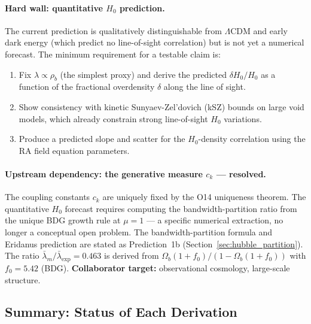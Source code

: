 \documentclass[11pt,a4paper]{article}
\theoremstyle{plain}
\theoremstyle{definition}
\theoremstyle{remark}
\begin{document}
\paragraph{Hard wall: quantitative $H_0$ prediction.}
The current prediction is qualitatively distinguishable from $\Lambda$CDM and
early dark energy (which predict no line-of-sight correlation) but is not yet
a numerical forecast. The minimum requirement for a testable claim is:
\begin{enumerate}[noitemsep]
  \item Fix $\lambda \propto \rho_b$ (the simplest proxy) and derive the
  predicted $\delta H_0 / H_0$ as a function of the fractional overdensity
  $\delta$ along the line of sight.
  \item Show consistency with kinetic Sunyaev-Zel'dovich (kSZ) bounds on large
  void models, which already constrain strong line-of-sight $H_0$ variations.
  \item Produce a predicted slope and scatter for the $H_0$-density correlation
  using the RA field equation parameters.
\end{enumerate}

\paragraph{Upstream dependency: the generative measure $c_k$ --- resolved.}
The coupling constants $c_k$ are uniquely fixed by the O14 uniqueness
theorem. The quantitative $H_0$ forecast requires computing the
bandwidth-partition ratio from the unique BDG growth rule at $\mu = 1$
--- a specific numerical extraction, no longer a conceptual open problem.
The bandwidth-partition formula
and Eridanus prediction are stated as Prediction~1b
(Section~\ref{sec:hubble_partition}). The ratio
$\bar\lambda_m/\bar\lambda_{\mathrm{exp}} = 0.463$ is derived
from $\Omega_b(1+f_0)/(1 - \Omega_b(1+f_0))$ with $f_0 = 5.42$ (BDG).
\textbf{Collaborator target:} observational cosmology, large-scale structure.

\subsection{Summary: Status of Each Derivation}
\end{document}
